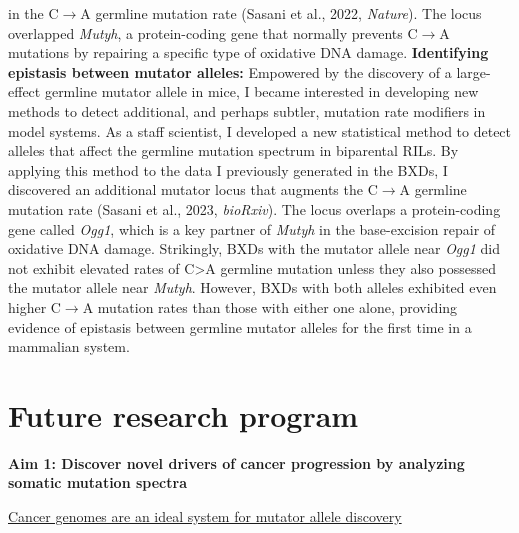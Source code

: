 \documentclass[11pt,a4paper,sans]{moderncv}
\begin{document}
in the C$\rightarrow$A germline mutation rate (Sasani et al., 2022, \emph{Nature}). The locus 
overlapped \emph{Mutyh}, a protein-coding gene that normally prevents C$\rightarrow$A mutations by 
repairing a specific type of oxidative DNA damage. 
\break \break
\textbf{Identifying epistasis between mutator alleles:}  Empowered by the 
discovery of a large-effect germline mutator allele in mice, I became interested 
in developing new methods to detect additional, and perhaps subtler, mutation 
rate modifiers in model systems. As a staff scientist, I developed a new 
statistical method to detect alleles that affect the germline mutation spectrum 
in biparental RILs. By applying this method to the data I previously generated 
in the BXDs, I discovered an additional mutator locus that augments the C$\rightarrow$A 
germline mutation rate (Sasani et al., 2023, \emph{bioRxiv}). The locus overlaps a 
protein-coding gene called \emph{Ogg1}, which is a key partner of \emph{Mutyh} in the 
base-excision repair of oxidative DNA damage. Strikingly, BXDs with the mutator 
allele near \emph{Ogg1} did not exhibit elevated rates of C>A germline mutation unless 
they also possessed the mutator allele near \emph{Mutyh}. However, BXDs with both 
alleles exhibited even higher C$\rightarrow$A mutation rates than those with either one 
alone, providing evidence of epistasis between germline mutator alleles for 
the first time in a mammalian system.

\section{Future research program}

\textbf{Aim 1: Discover novel drivers of cancer progression by analyzing somatic 
mutation spectra}

\underline{Cancer genomes are an ideal system for mutator allele discovery}
\end{document}
